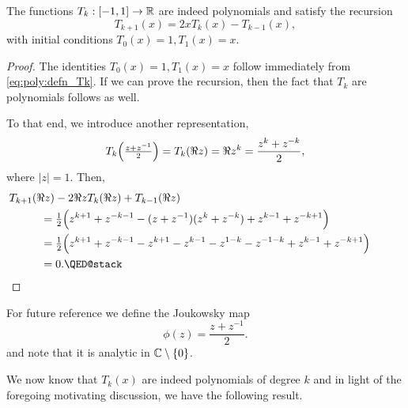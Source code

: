 \begin{lemma} \label{th:poly:chebpolys}
   The functions $T_k : [-1,1] \to \mathbb{R}$ are indeed polynomials and
   satisfy the recursion
   \begin{equation} \label{eq:poly:chebrecursion}
      T_{k+1}(x) = 2 x T_k(x) - T_{k-1}(x),
   \end{equation}
   with initial conditions $T_0(x) = 1, T_1(x) = x$.
\end{lemma}
\begin{proof}
   The identities $T_0(x) = 1, T_1(x) = x$ follow immediately from
   \eqref{eq:poly:defn_Tk}. If we can prove the recursion, then
   the fact that $T_k$ are polynomials follows as well.

   To that end, we introduce another representation,
   \[
      T_k\Big( {\textstyle \frac{z + z^{-1}}{2}} \Big)
      = T_k(\Re z)
      = \Re z^k = \frac{z^k + z^{-k}}{2},
   \]
   where $|z| = 1$. Then,
   \begin{align*}
      & \hspace{-1cm} T_{k+1}(\Re z) - 2 \Re z T_k(\Re z) + T_{k-1}(\Re z) \\
      &= \smfrac12 \B(
         z^{k+1} + z^{-k-1}  - (z+z^{-1}) (z^k+z^{-k})
         + z^{k-1} + z^{-k+1} \B) \\
      &= \smfrac12 \B( z^{k+1} + z^{-k-1}
               - z^{k+1} - z^{k-1} - z^{1-k} - z^{-1-k}
               + z^{k-1} + z^{-k+1} \B) \\
      &=0. \qedhere
   \end{align*}
\end{proof}

For future reference we define the Joukowsky map
\[
   \phi(z) = \frac{z+z^{-1}}{2}.
\]
and note that it is analytic in $\mathbb{C} \setminus \{0\}$.

We now know that $T_k(x)$ are indeed polynomials of degree $k$ and in light of
the foregoing motivating discussion, we have the following result.

